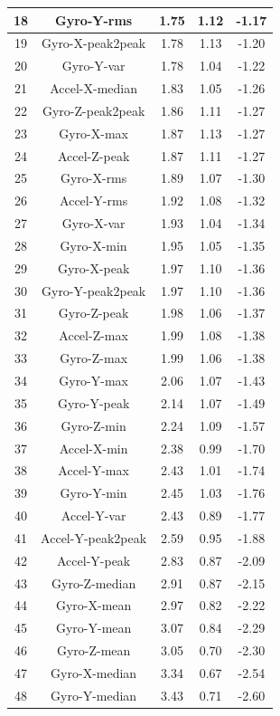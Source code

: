 \documentclass[withoutpreface]{cumcmthesis}
\begin{document}
\begin{appendices}
\begin{longtable}{|c|c|c|c|c|}
    18 & Gyro-Y-rms & 1.75 & 1.12 & -1.17 \\ \hline
    19 & Gyro-X-peak2peak & 1.78 & 1.13 & -1.20 \\ \hline
    20 & Gyro-Y-var & 1.78 & 1.04 & -1.22 \\ \hline
    21 & Accel-X-median & 1.83 & 1.05 & -1.26 \\ \hline
    22 & Gyro-Z-peak2peak & 1.86 & 1.11 & -1.27 \\ \hline
    23 & Gyro-X-max & 1.87 & 1.13 & -1.27 \\ \hline
    24 & Accel-Z-peak & 1.87 & 1.11 & -1.27 \\ \hline
    25 & Gyro-X-rms & 1.89 & 1.07 & -1.30 \\ \hline
    26 & Accel-Y-rms & 1.92 & 1.08 & -1.32 \\ \hline
    27 & Gyro-X-var & 1.93 & 1.04 & -1.34 \\ \hline
    28 & Gyro-X-min & 1.95 & 1.05 & -1.35 \\ \hline
    29 & Gyro-X-peak & 1.97 & 1.10 & -1.36 \\ \hline
    30 & Gyro-Y-peak2peak & 1.97 & 1.10 & -1.36 \\ \hline
    31 & Gyro-Z-peak & 1.98 & 1.06 & -1.37 \\ \hline
    32 & Accel-Z-max & 1.99 & 1.08 & -1.38 \\ \hline
    33 & Gyro-Z-max & 1.99 & 1.06 & -1.38 \\ \hline
    34 & Gyro-Y-max & 2.06 & 1.07 & -1.43 \\ \hline
    35 & Gyro-Y-peak & 2.14 & 1.07 & -1.49 \\ \hline
    36 & Gyro-Z-min & 2.24 & 1.09 & -1.57 \\ \hline
    37 & Accel-X-min & 2.38 & 0.99 & -1.70 \\ \hline
    38 & Accel-Y-max & 2.43 & 1.01 & -1.74 \\ \hline
    39 & Gyro-Y-min & 2.45 & 1.03 & -1.76 \\ \hline
    40 & Accel-Y-var & 2.43 & 0.89 & -1.77 \\ \hline
    41 & Accel-Y-peak2peak & 2.59 & 0.95 & -1.88 \\ \hline
    42 & Accel-Y-peak & 2.83 & 0.87 & -2.09 \\ \hline
    43 & Gyro-Z-median & 2.91 & 0.87 & -2.15 \\ \hline
    44 & Gyro-X-mean & 2.97 & 0.82 & -2.22 \\ \hline
    45 & Gyro-Y-mean & 3.07 & 0.84 & -2.29 \\ \hline
    46 & Gyro-Z-mean & 3.05 & 0.70 & -2.30 \\ \hline
    47 & Gyro-X-median & 3.34 & 0.67 & -2.54 \\ \hline
    48 & Gyro-Y-median & 3.43 & 0.71 & -2.60 \\ \hline
\end{longtable}


\end{appendices}
\end{document}
